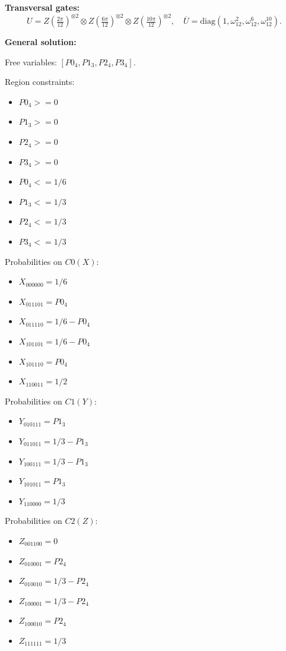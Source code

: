 \documentclass[11pt]{article}
\begin{document}
\noindent\textbf{Transversal gates:}
\[
    U=Z \left(\tfrac{2\pi}{12}\right)^{\otimes2} \otimes Z \left(\tfrac{6\pi}{12}\right)^{\otimes2} \otimes Z \left(\tfrac{10\pi}{12}\right)^{\otimes2},\quad
    \overline U=\mathrm{diag}(1,\omega_{12}^{2},\omega_{12}^{6},\omega_{12}^{10}).
\]

\noindent\textbf{General solution:}

Free variables: $[P0_4, P1_3, P2_4, P3_4]$.

Region constraints:
\begin{itemize}
    \item $P0_4 >= 0$
    \item $P1_3 >= 0$
    \item $P2_4 >= 0$
    \item $P3_4 >= 0$
    \item $P0_4 <= 1/6$
    \item $P1_3 <= 1/3$
    \item $P2_4 <= 1/3$
    \item $P3_4 <= 1/3$
\end{itemize}

Probabilities on $C0 (X)$:
\begin{itemize}
    \item $X_{000000} = 1/6$
    \item $X_{011101} = P0_4$
    \item $X_{011110} = 1/6 - P0_4$
    \item $X_{101101} = 1/6 - P0_4$
    \item $X_{101110} = P0_4$
    \item $X_{110011} = 1/2$
\end{itemize}

Probabilities on $C1 (Y)$:
\begin{itemize}
    \item $Y_{010111} = P1_3$
    \item $Y_{011011} = 1/3 - P1_3$
    \item $Y_{100111} = 1/3 - P1_3$
    \item $Y_{101011} = P1_3$
    \item $Y_{110000} = 1/3$
\end{itemize}

Probabilities on $C2 (Z)$:
\begin{itemize}
    \item $Z_{001100} = 0$
    \item $Z_{010001} = P2_4$
    \item $Z_{010010} = 1/3 - P2_4$
    \item $Z_{100001} = 1/3 - P2_4$
    \item $Z_{100010} = P2_4$
    \item $Z_{111111} = 1/3$
\end{itemize}
\end{document}
